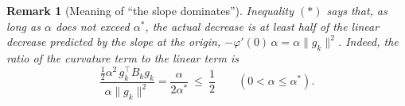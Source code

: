 \documentclass[11pt]{article}
\newtheorem*{remark}{Remark}
\begin{document}
\begin{remark}[Meaning of ``the slope dominates'']
Inequality $(\ast)$ says that, as long as $\alpha$ does not exceed $\alpha^*$, the actual decrease is at
least half of the linear decrease predicted by the slope at the origin,
$-\varphi'(0)\,\alpha = \alpha\|g_k\|^2$. Indeed, the ratio of the curvature term
to the linear term is
\[
\frac{\tfrac12\alpha^2\, g_k^\top B_k g_k}{\alpha\|g_k\|^2} = \frac{\alpha}{2\alpha^*} \ \le\ \frac12
\qquad (0<\alpha\le\alpha^*).
\]
\end{remark}
\end{document}

